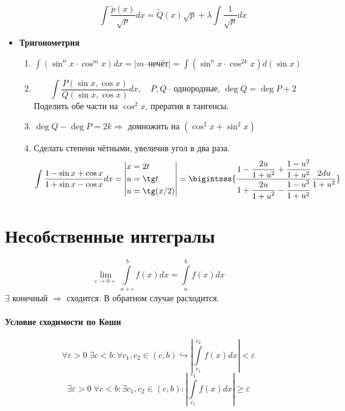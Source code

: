 \documentclass{article}
\newcommand\ddfrac[2]{\frac{\displaystyle #1}{\displaystyle #2}}
\newcommand{\x}{\text}
\begin{document}
\begin{itemize}
\begin{enumerate}
                    $$ \int\frac{\widetilde{p}(x)}{\sqrt{p}}dx = \widetilde{Q}(x)\sqrt{p} + \lambda\int\frac{1}{\sqrt{p}}dx $$
          \end{enumerate}
    \item \textbf{Тригонометрия}
          \begin{enumerate}
              \item $\int (\sin^nx \cdot \cos^m x ) dx  = |m \x{--нечёт}| = \int (\sin^nx\cdot \cos^{2k}x)d(\sin x)$
              \item $$\int \frac{P(\sin x, \cos x)}{Q(\sin x, \cos x)} dx, \quad P,Q\x{-- однородные, } \deg Q = \deg P + 2$$
                    Поделить обе части на $\cos^2x$, прератив в тангенсы.
              \item $\deg Q - \deg P = 2k \Rightarrow $ домножить на $(\cos^2x + \sin^2 x)$
              \item Сделать степени чётными, увеличив угол в два раза.
                    \begin{equation*}
                        \int \frac{1- \sin x + \cos x}{1+ \sin x - \cos x} dx = \left|
                        \begin{aligned}
                             & x = 2t       \\
                             & u = \tg t    \\
                             & u = \tg(x/2)
                        \end{aligned} \right| = \bigintsss{\ddfrac{1 - \frac{2u}{1+u^2} + \frac{1 - u^2}{1 + u^2}}{1 + \ddfrac{2u}{1+u^2} - \frac{1-u^2}{1 + u^2}}\frac{2 du}{1 + u^2}}
                    \end{equation*}
          \end{enumerate}
\end{itemize}

\newpage
\section{Несобственные интегралы}
$$ \lim\limits_{\varepsilon \to 0+}\int\limits_{a+\varepsilon}^b f(x) dx = \int\limits_a^bf(x)dx $$
$\exists$ конечный $\Rightarrow$ сходится. В обратном случае расходится.
\paragraph*{Условие сходимости по Коши}
$$\forall \varepsilon > 0 \; \exists c < b: \forall c_1, c_2 \in(c,b) \hookrightarrow \left| \int\limits_{c_1}^{c_2}f(x)dx \right| < \varepsilon$$
$$\exists \varepsilon > 0 \; \forall c < b: \exists c_1, c_2 \in(c,b) : \left| \int\limits_{c_1}^{c_2}f(x)dx \right| \geq \varepsilon$$
\end{document}
